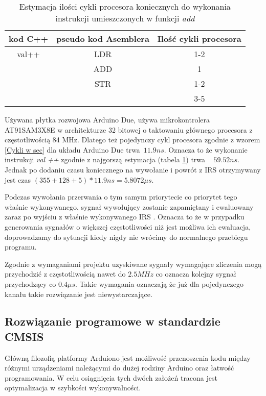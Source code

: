 \begin{table}[b]
        \begin{center}
        \caption{Estymacja ilości cykli procesora koniecznych do wykonania instrukcji umieszczonych w funkcji \textit{add} }
        \label{decompile add}
        \begin{tabular}{c|c|c}
                kod C++ & pseudo kod Asemblera & Ilość cykli procesora \cite{cycles} \\ \hline
                val++ & LDR & 1-2 \\
                        & ADD & 1 \\
                        & STR & 1-2 \\ 
                        \hline \hline
                        &   &  3-5 
        \end{tabular}
        \end{center}
\end{table}


Używana płytka rozwojowa Arduino Due, używa mikrokontrolera AT91SAM3X8E w architekturze 32 bitowej o taktowaniu głównego procesora z częstotliwością 84 MHz. Dlatego też pojedynczy cykl procesora zgodnie z wzorem \ref{Cykli w sec} dla układu Arduino Due trwa~$ 11.9 ns $. 
Oznacza to że wykonanie instrukcji \textit{val ++} zgodnie z najgorszą estymacja (tabela \ref{decompile add}) trwa ~ $59.52 ns$. 
Jednak po dodaniu czasu koniecznego na wywołanie i powrót z IRS otrzymywany jest czas $ (355 + 128 + 5) * 11.9 ns =  5.8072 \mu s $. 

Podczas wywołania przerwania o tym samym priorytecie co priorytet tego właśnie wykonywanego, sygnał wywołujący zostanie zapamiętany i ewaluowany zaraz po wyjściu z właśnie wykonywanego IRS  \cite{datasheet}. 
Oznacza to że w przypadku generowania sygnałów o większej częstotliwości niż jest możliwa ich ewaluacja, doprowadzamy do sytuacji kiedy nigdy nie wrócimy do normalnego przebiegu programu. 

Zgodnie z wymaganiami projektu uzyskiwane sygnały wymagające zliczenia mogą przychodzić z częstotliwością nawet do $2.5MHz$ co oznacza kolejny sygnał przychodzący co $0.4\mu s$.
Takie wymagania oznaczają że już dla pojedynczego kanału takie rozwiązanie jest niewystarczające. 

\subsection{Rozwiązanie programowe w standardzie CMSIS}
\label{dzial CMSIS}
Główną filozofią platformy Arduiono jest możliwość przenoszenia kodu między różnymi urządzeniami należącymi do dużej rodziny Arduino oraz łatwość programowania.
W celu osiągnięcia tych dwóch założeń tracona jest optymalizacja w szybkości wykonywalności. 

